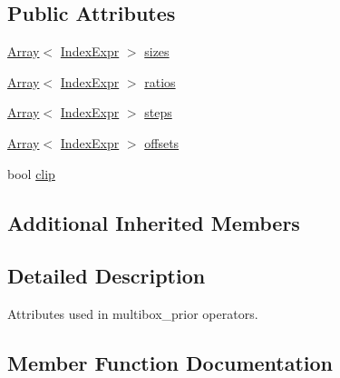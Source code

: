 \subsection*{Public Attributes}
\begin{DoxyCompactItemize}
\item 
\hyperlink{classtvm_1_1Array}{Array}$<$ \hyperlink{namespacetvm_1_1relay_ae153a27d81399fd266b8d598227764c4}{Index\+Expr} $>$ \hyperlink{structtvm_1_1relay_1_1MultiBoxPriorAttrs_ad6d089344fa741021584222ffa70a451}{sizes}
\item 
\hyperlink{classtvm_1_1Array}{Array}$<$ \hyperlink{namespacetvm_1_1relay_ae153a27d81399fd266b8d598227764c4}{Index\+Expr} $>$ \hyperlink{structtvm_1_1relay_1_1MultiBoxPriorAttrs_af674c8ba5ac7021827987bca3e1e4b1a}{ratios}
\item 
\hyperlink{classtvm_1_1Array}{Array}$<$ \hyperlink{namespacetvm_1_1relay_ae153a27d81399fd266b8d598227764c4}{Index\+Expr} $>$ \hyperlink{structtvm_1_1relay_1_1MultiBoxPriorAttrs_a312f6999492eb61bf20593a4f30acd35}{steps}
\item 
\hyperlink{classtvm_1_1Array}{Array}$<$ \hyperlink{namespacetvm_1_1relay_ae153a27d81399fd266b8d598227764c4}{Index\+Expr} $>$ \hyperlink{structtvm_1_1relay_1_1MultiBoxPriorAttrs_a6c7f77acdcf71211d14507c9cb1a3453}{offsets}
\item 
bool \hyperlink{structtvm_1_1relay_1_1MultiBoxPriorAttrs_ab9175969c52d2c4d9cdfdcfbc4fce995}{clip}
\end{DoxyCompactItemize}
\subsection*{Additional Inherited Members}


\subsection{Detailed Description}
Attributes used in multibox\+\_\+prior operators. 

\subsection{Member Function Documentation}
